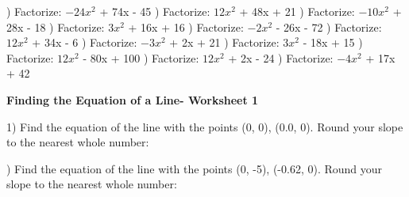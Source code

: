 \documentclass{article}%
\begin{document}
) Factorize: $-24x^2$ + 74x - 45%
\newline%
\newline%
) Factorize: $12x^2$ + 48x + 21%
\newline%
\newline%
) Factorize: $-10x^2$ + 28x - 18%
\newline%
\newline%
) Factorize: $3x^2$ + 16x + 16%
\newline%
\newline%
) Factorize: $-2x^2$ - 26x - 72%
\newline%
\newline%
) Factorize: $12x^2$ + 34x - 6%
\newline%
\newline%
) Factorize: $-3x^2$ + 2x + 21%
\newline%
\newline%
) Factorize: $3x^2$ - 18x + 15%
\newline%
\newline%
) Factorize: $12x^2$ - 80x + 100%
\newline%
\newline%
) Factorize: $12x^2$ + 2x - 24%
\newline%
\newline%
) Factorize: $-4x^2$ + 17x + 42%
\newline%
\newline%
\newline%
\pagebreak%
\large%
\begin{center}%
\textbf{Finding the Equation of a Line- Worksheet 1}%
\newline%
\newline%
\newline%
\end{center} \normalsize%
1) Find the equation of the line with the points (0, 0), (0.0, 0). Round your slope to the nearest whole number:

%
\newline%
\newline%
) Find the equation of the line with the points (0, -5), (-0.62, 0). Round your slope to the nearest whole number:
\end{document}

